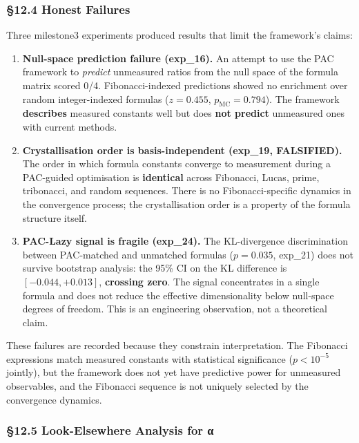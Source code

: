 \documentclass[
  11pt,
  a4paper]{article}
\begin{document}
\subsubsection{§12.4 Honest Failures}\label{honest-failures}

Three milestone3 experiments produced results that limit the framework's
claims:

\begin{enumerate}
\def\labelenumi{\arabic{enumi}.}
\item
  \textbf{Null-space prediction failure (exp\_16).} An attempt to use
  the PAC framework to \emph{predict} unmeasured ratios from the null
  space of the formula matrix scored 0/4. Fibonacci-indexed predictions
  showed no enrichment over random integer-indexed formulas
  (\(z = 0.455\), \(p_{\text{MC}} = 0.794\)). The framework
  \textbf{describes} measured constants well but does \textbf{not
  predict} unmeasured ones with current methods.
\item
  \textbf{Crystallisation order is basis-independent (exp\_19,
  FALSIFIED).} The order in which formula constants converge to
  measurement during a PAC-guided optimisation is \textbf{identical}
  across Fibonacci, Lucas, prime, tribonacci, and random sequences.
  There is no Fibonacci-specific dynamics in the convergence process;
  the crystallisation order is a property of the formula structure
  itself.
\item
  \textbf{PAC-Lazy signal is fragile (exp\_24).} The KL-divergence
  discrimination between PAC-matched and unmatched formulas
  (\(p = 0.035\), exp\_21) does not survive bootstrap analysis: the 95\%
  CI on the KL difference is \([-0.044, +0.013]\), \textbf{crossing
  zero}. The signal concentrates in a single formula and does not reduce
  the effective dimensionality below null-space degrees of freedom. This
  is an engineering observation, not a theoretical claim.
\end{enumerate}

These failures are recorded because they constrain interpretation. The
Fibonacci expressions match measured constants with statistical
significance (\(p < 10^{-5}\) jointly), but the framework does not yet
have predictive power for unmeasured observables, and the Fibonacci
sequence is not uniquely selected by the convergence dynamics.

\subsubsection{§12.5 Look-Elsewhere Analysis for
α}\label{look-elsewhere-analysis-for-ux3b1}
\end{document}
